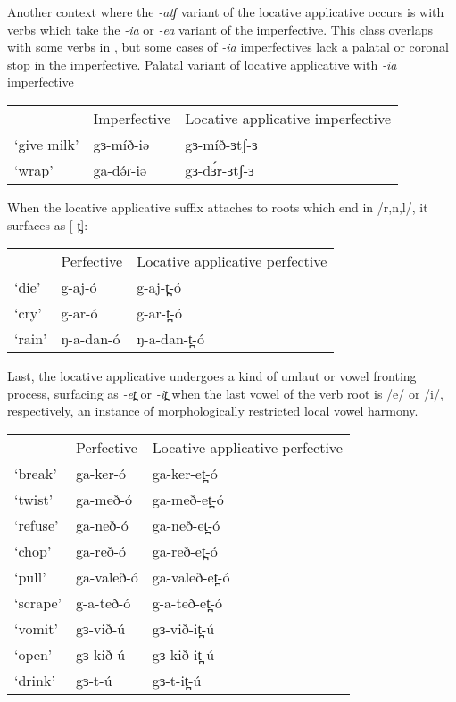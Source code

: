 Another context where the \textit{-atʃ} variant of the locative applicative occurs is with verbs which take the \textit{-ia} or \textit{-ea} variant of the imperfective. This class overlaps with some verbs in , but some cases of \textit{-ia} imperfectives lack a palatal or coronal stop in the imperfective.
\ea Palatal variant of locative applicative with \textit{-ia} imperfective 
\begin{tabular}[t]{lll}
& Imperfective & {Locative applicative imperfective} \\
`give milk'  	&  gɜ-míð-iə 	& gɜ-míð-ɜtʃ-ɜ \\ 
`wrap' &  ga-də́ɾ-iə 	& gɜ-dɜ́r-ɜtʃ-ɜ \\ %
\end{tabular}
\z 
When the locative applicative suffix attaches to roots which end in /r,n,l/, it surfaces as [-t̪]:
\ea
\begin{tabular}[t]{lll}
		&	Perfective 	&  Locative applicative perfective \\
`die' 		& 	g-aj-ó 			&	g-aj-t̪-ó\\ 
`cry' 	& 	g-ar-ó		& 	g-ar-t̪-ó \\
`rain' & 	ŋ-a-dan-ó & 	ŋ-a-dan-t̪-ó \\
\end{tabular}
\z
 
Last, the locative applicative undergoes a kind of umlaut or vowel fronting process, surfacing as \textit{-et̪} or \textit{-it̪} when the last vowel of the verb root is /e/ or /i/, respectively, an instance of morphologically restricted local vowel harmony.

\ea 
\begin{tabular}[t]{lll}
			&	Perfective 		&  	Locative applicative perfective \\
`break' & 	ga-ker-ó 	&	ga-ker-et̪-ó\\ 
`twist' & 	ga-með-ó 	&	ga-með-et̪-ó\\ 
`refuse' & 	ga-neð-ó 	&	ga-neð-et̪-ó\\ 
`chop' & 	ga-reð-ó 	&	ga-reð-et̪-ó\\ 
`pull' 		& 	ga-valeð-ó	& 	ga-valeð-et̪-ó \\
`scrape'	& 	g-a-teð-ó		&  	g-a-teð-et̪-ó \\
`vomit' 		& 	gɜ-við-ú		& 	gɜ-við-it̪-ú		\\
`open' 		& 	gɜ-kið-ú		& 	gɜ-kið-it̪-ú		\\
`drink'	& 	gɜ-t-ú		&  	gɜ-t-it̪-ú \\
\end{tabular} 
\z 

